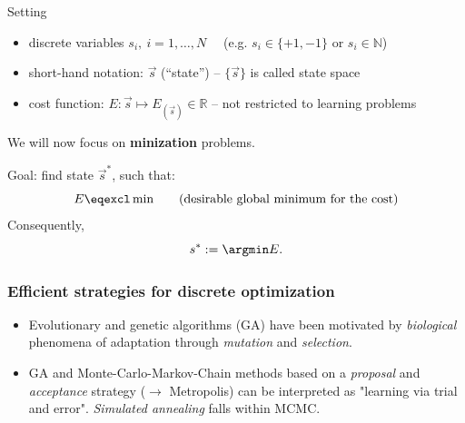 \newpage
\begin{frame}
\begin{block}{Setting} 
\begin{itemize}
 \item discrete variables $s_i, \ i = 1, \ldots, N\quad$ (e.g. $s_i \in \{+1, -1\}$   or $s_i \in \mathbb N$) 
 \item \indent short-hand notation: $\vec{s}$ (``state'') -- { $\{\vec{s}\}$ is called state space }
 \item {cost function:} $E: \vec{s} \mapsto E_{(\vec{s})} \in \mathbb{R}$ -- { not restricted to learning problems}
\end{itemize}
\end{block}

We will now focus on \textbf{minization} problems.

\begin{block}{Goal: find state $\vec{s}^*$, such that:} 
\begin{equation*}
	E \eqexcl \min \qquad (\text{desirable global minimum for the cost})
\end{equation*}
Consequently,
\begin{equation*}
	s^* := \argmin E.
\end{equation*}
\end{block}
\end{frame}

\begin{frame}
\frametitle{Efficient strategies for discrete optimization}

\begin{itemize}
\item Evolutionary and genetic algorithms (GA) have been
  motivated by \emph{biological} phenomena of adaptation through
  \emph{mutation} and \emph{selection}.
\item GA and Monte-Carlo-Markov-Chain methods based on a \emph{proposal} and
  \emph{acceptance} strategy ($\rightarrow$ Metropolis) can be interpreted
  as "learning via trial and error". \emph{Simulated annealing} falls within MCMC.
\end{itemize}
\end{frame}

